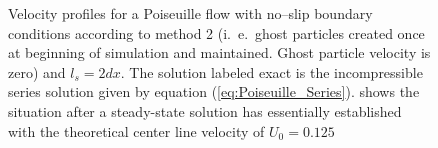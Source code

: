 \documentclass[11pt,a4paper,twoside]{report}
\begin{document}
\begin{figure}[!htbp]
{}

\caption[Velocity profiles Poiseuille flow]{Velocity profiles for a Poiseuille flow with no--slip boundary conditions according to method 2 (i.\ e.\ ghost particles created once at beginning of simulation and maintained. Ghost particle velocity is zero) and $l_s=2dx$. The solution labeled exact is the incompressible series solution given by equation (\ref{eq:Poiseuille_Series}).   shows the situation after a steady-state solution has essentially established with the theoretical center line velocity of $U_0=0.125$}

\end{figure}
\end{document}
